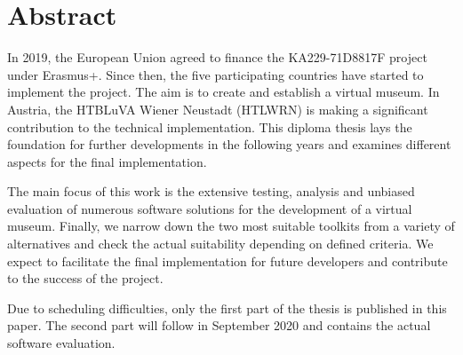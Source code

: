 \chapter{Abstract}

In 2019, the European Union agreed to finance the KA229-71D8817F project under Erasmus+. Since then, the five participating countries have started to implement the project. The aim is to create and establish a virtual museum. In Austria, the HTBLuVA Wiener Neustadt (HTLWRN) is making a significant contribution to the technical implementation. This diploma thesis lays the foundation for further developments in the following years and examines different aspects for the final implementation.

The main focus of this work is the extensive testing, analysis and unbiased evaluation of numerous software solutions for the development of a virtual museum. Finally, we narrow down the two most suitable toolkits from a variety of alternatives and check the actual suitability depending on defined criteria. We expect to facilitate the final implementation for future developers and contribute to the success of the project.

Due to scheduling difficulties, only the first part of the thesis is published in this paper. The second part will follow in September 2020 and contains the actual software evaluation.